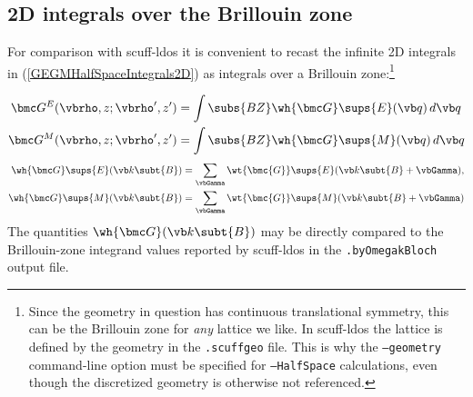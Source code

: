 \documentclass[letterpaper]{article}
\begin{document}
\subsection{2D integrals over the Brillouin zone}

For comparison with {\sc scuff-ldos} it is convenient
to recast the infinite 2D integrals in (\ref{GEGMHalfSpaceIntegrals2D})
as integrals over a Brillouin zone:\footnote{Since the geometry
in question has continuous translational symmetry, this can be
the Brillouin zone for \textit{any} lattice we like. In 
{\sc scuff-ldos} the lattice is defined by the geometry 
in the \texttt{.scuffgeo} file. This is why the 
\texttt{--geometry} command-line option must be specified 
for \texttt{--HalfSpace} calculations, even though the 
discretized geometry is otherwise not referenced.}

\begin{subequations}
\begin{align}
\bmc G^{E}(\vbrho, z; \vbrho^\prime, z^\prime)
&=\int\subs{BZ} \wh{\bmc G}\sups{E}(\vb q) \, d \vb q
\\
\bmc G^{M}(\vbrho, z; \vbrho^\prime, z^\prime)
&=\int\subs{BZ} \wh{\bmc G}\sups{M}(\vb q) \, d \vb q
\end{align}
\label{GEGMHalfSpaceIntegralsBZ}
\end{subequations}
\begin{subequations}
\begin{align}
\wh{\bmc G}\sups{E}(\vb k\subt{B})
&=\sum_{\vbGamma} \wt{\bmc {G}}\sups{E}(\vb k\subt{B} + \vbGamma), 
\\
\wh{\bmc G}\sups{M}(\vb k\subt{B})
&=\sum_{\vbGamma} \wt{\bmc {G}}\sups{M}(\vb k\subt{B} + \vbGamma)
\end{align}
\label{GEGMHalfSpaceIntegrandsBZ}%
\end{subequations}
The quantities $\wh{\bmc G}(\vb k\subt{B})$ may be directly
compared to the Brillouin-zone integrand values reported
by {\sc scuff-ldos} in the \texttt{.byOmegakBloch} output file.

\end{document}

